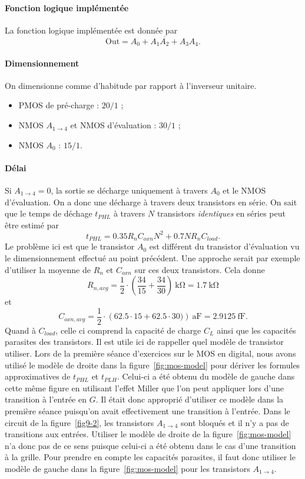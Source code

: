 \documentclass[frenchb,DIV=14]{scrartcl}
\begin{document}
\paragraph{Fonction logique implémentée}
La fonction logique implémentée est donnée par
\[ \text{Out} = \overline{A_0 + A_1A_2 + A_3A_4}.\]

\paragraph{Dimensionnement}
On dimensionne comme d'habitude par rapport à l'inverseur unitaire.
\begin{itemize}
	\item PMOS de pré-charge : $20/1$ ;
	\item NMOS $A_{1\to4}$ et NMOS d'évaluation : $30/1$ ;
	\item NMOS $A_0$ : $15/1$. 
\end{itemize}

\paragraph{Délai}
Si $A_{1\to4} = 0$, la sortie se décharge uniquement à travers $A_0$
et le NMOS d'évaluation. On a donc une décharge à travers deux transistors
en série. On sait que le temps de déchage $t_{PHL}$ à travers $N$
transistors \emph{identiques} en séries peut être estimé par
\[ t_{PHL} = 0.35R_nC_{oxn}N^2 + 0.7NR_nC_{load}. \]
Le problème ici est que le transistor $A_0$ est différent du transistor
d'évaluation vu le dimensionnement effectué au point précédent.
Une approche serait par exemple d'utiliser la moyenne de $R_n$ et $C_{oxn}$
sur ces deux transistors. Cela donne
\[ R_{n,avg} = \frac{1}{2} \cdot \left(\frac{34}{15} + \frac{34}{30}\right)\SI{}{\kilo\ohm}
= \SI{1.7}{\kilo\ohm} \]
et
\[ C_{oxn,avg} = \frac{1}{2} \cdot \left(62.5\cdot 15 + 62.5\cdot 30)\right)\SI{}{\atto\farad}
= \SI{2.9125}{\femto\farad}. \]
Quand à $C_{load}$, celle ci comprend la capacité de charge $C_L$ ainsi que
les capacités parasites des transistors. Il est utile ici de rappeller
quel modèle de transistor utiliser. Lors de la première séance d'exercices sur
le MOS en digital, nous avons utilisé le modèle de droite dans la figure~\ref{fig:mos-model}
pour dériver les formules approximatives de $t_{PHL}$ et $t_{PLH}$.
Celui-ci a été obtenu du modèle de gauche dans cette même figure en utilisant
l'effet Miller que l'on peut appliquer lors d'une transition à l'entrée en $G$.
Il était donc approprié d'utiliser ce modèle dans la première séance puisqu'on
avait effectivement une transition à l'entrée.
Dans le circuit de la figure~\ref{fig9-2}, les transistors $A_{1\to 4}$ sont
bloqués et il n'y a pas de transitions aux entrées. Utiliser le modèle de droite
de la figure~\ref{fig:mos-model} n'a donc pas de ce sens puisque celui-ci a été
obtenu dans le cas d'une transition à la grille. Pour prendre en compte les capacités
parasites, il faut donc utiliser le modèle de gauche dans la figure~\ref{fig:mos-model}
pour les transistors $A_{1\to 4}$.\\
\end{document}
